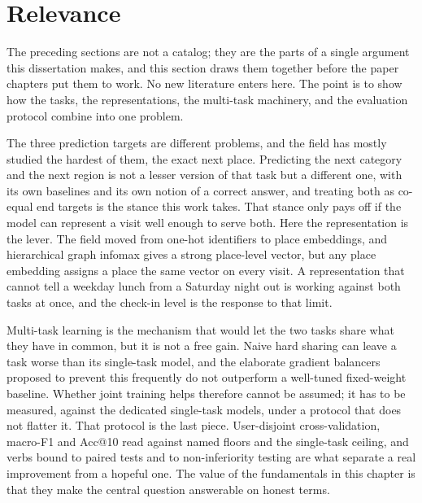 
\section{Relevance}
\label{sec:fund:relevance}

The preceding sections are not a catalog; they are the parts of a single argument this
dissertation makes, and this section draws them together before the paper chapters put
them to work. No new literature enters here. The point is to show how the tasks, the
representations, the multi-task machinery, and the evaluation protocol combine into one
problem.

The three prediction targets are different problems, and the field has
mostly studied the hardest of them, the exact next place. Predicting the next category
and the next region is not a lesser version of that task but a different one, with its
own baselines and its own notion of a correct answer, and treating both as co-equal
end targets is the stance this work takes. That stance only pays off if the model can
represent a visit well enough to serve both. Here the representation is the lever. The
field moved from one-hot identifiers to place embeddings, and hierarchical graph
infomax gives a strong place-level vector, but any place embedding assigns a place the
same vector on every visit. A representation that cannot tell a weekday lunch from a
Saturday night out is working against both tasks at once, and the check-in level is the
response to that limit.

Multi-task learning is the mechanism that would let the two tasks share what they have
in common, but it is not a free gain. Naive hard sharing can leave a task worse than
its single-task model, and the elaborate gradient balancers proposed to prevent this
frequently do not outperform a well-tuned fixed-weight baseline. Whether joint training
helps therefore cannot be assumed; it has to be measured, against the dedicated
single-task models, under a protocol that does not flatter it. That protocol is the
last piece. User-disjoint cross-validation, macro-F1 and Acc@10 read against named
floors and the single-task ceiling, and verbs bound to paired tests and to
non-inferiority testing are what separate a real improvement from a hopeful one. The
value of the fundamentals in this chapter is that they make the central question
answerable on honest terms.

